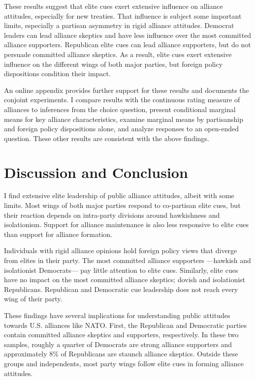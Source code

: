 \documentclass[12pt]{article}
\begin{document}
These results suggest that elite cues exert extensive influence on alliance attitudes, especially for new treaties.
That influence is subject some important limits, especially a partisan asymmetry in rigid alliance attitudes. 
Democrat leaders can lead alliance skeptics and have less influence over the most committed alliance supporters. 
Republican elite cues can lead alliance supporters, but do not persuade committed alliance skeptics. 
As a result, elite cues exert extensive influence on the different wings of both major parties, but foreign policy dispositions condition their impact. 


An online appendix provides further support for these results and documents the conjoint experiments. 
I compare results with the continuous rating measure of alliances to inferences from the choice question, present conditional marginal means for key alliance characteristics, examine marginal means by partisanship and foreign policy dispositions alone, and analyze responses to an open-ended question. 
These other results are consistent with the above findings. 


\section{Discussion and Conclusion} 


I find extensive elite leadership of public alliance attitudes, albeit with some limits.  
Most wings of both major parties respond to co-partisan elite cues, but their reaction depends on intra-party divisions around hawkishness and isolationism.
Support for alliance maintenance is also less responsive to elite cues than support for alliance formation. 


Individuals with rigid alliance opinions hold foreign policy views that diverge from elites in their party.  
The most committed alliance supporters ---hawkish and isolationist Democrats--- pay little attention to elite cues.
Similarly, elite cues have no impact on the most committed alliance skeptics; dovish and isolationist Republicans. 
Republican and Democratic cue leadership does not reach every wing of their party. 


These findings have several implications for understanding public attitudes towards U.S. alliances like NATO. 
First, the Republican and Democratic parties contain committed alliance skeptics and supporters, respectively.
In these two samples, roughly a quarter of Democrats are strong alliance supporters and approximately 8\% of Republicans are staunch alliance skeptics.
Outside these groups and independents, most party wings follow elite cues in forming alliance attitudes. 
\end{document}

